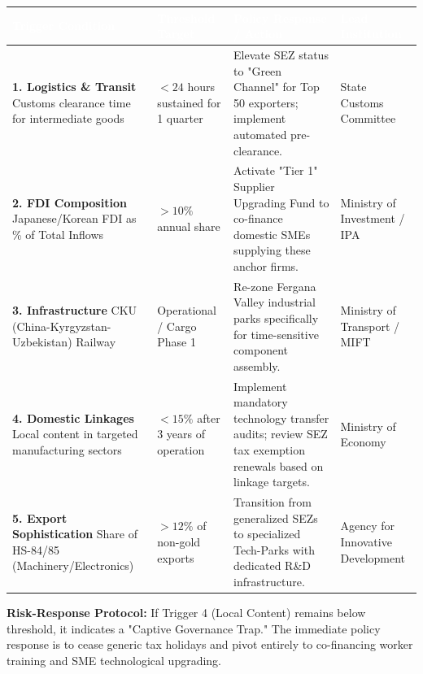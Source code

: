 \documentclass[11pt,a4paper]{article}
\begin{document}
\renewcommand{\arraystretch}{1.4}
\begin{longtable}{p{4cm} p{3cm} p{4.5cm} p{3.5cm}}
\toprule
\rowcolor{adbblue}\textcolor{white}{\textbf{Trigger Condition}} & \textcolor{white}{\textbf{Threshold Target}} & \textcolor{white}{\textbf{Policy Response / Action}} & \textcolor{white}{\textbf{Lead Institution}} \\
\midrule
\endhead

\textbf{1. Logistics \& Transit} \newline Customs clearance time for intermediate goods & $< 24$ hours sustained for 1 quarter & Elevate SEZ status to "Green Channel" for Top 50 exporters; implement automated pre-clearance. & State Customs Committee \\
\midrule
\textbf{2. FDI Composition} \newline Japanese/Korean FDI as \% of Total Inflows & $> 10\%$ annual share & Activate "Tier 1" Supplier Upgrading Fund to co-finance domestic SMEs supplying these anchor firms. & Ministry of Investment / IPA \\
\midrule
\textbf{3. Infrastructure} \newline CKU (China-Kyrgyzstan-Uzbekistan) Railway & Operational / Cargo Phase 1 & Re-zone Fergana Valley industrial parks specifically for time-sensitive component assembly. & Ministry of Transport / MIFT \\
\midrule
\textbf{4. Domestic Linkages} \newline Local content in targeted manufacturing sectors & $< 15\%$ after 3 years of operation & Implement mandatory technology transfer audits; review SEZ tax exemption renewals based on linkage targets. & Ministry of Economy \\
\midrule
\textbf{5. Export Sophistication} \newline Share of HS-84/85 (Machinery/Electronics) & $> 12\%$ of non-gold exports & Transition from generalized SEZs to specialized Tech-Parks with dedicated R\&D infrastructure. & Agency for Innovative Development \\

\bottomrule
\end{longtable}

\textbf{Risk-Response Protocol:} If Trigger 4 (Local Content) remains below threshold, it indicates a "Captive Governance Trap." The immediate policy response is to cease generic tax holidays and pivot entirely to co-financing worker training and SME technological upgrading.

\newpage
\end{document}
